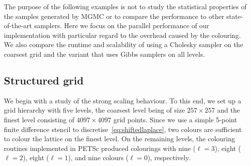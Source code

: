 \documentclass[
fontsize=11pt,
paper=a4,
numbers=noenddot
]{scrartcl}
\begin{document}

The purpose of the following examples is not to study the statistical properties of the samples generated by MGMC or to compare the performance to other state-of-the-art samplers. Here we focus on the parallel performance of our implementation with particular regard to the overhead caused by the colouring. We also compare the runtime and scalability of using a Cholesky sampler on the coarsest grid and the variant that uses Gibbs samplers on all levels.

\subsection{Structured grid}
We begin with a study of the strong scaling behaviour. To this end, we set up a grid hierarchy with five levels, the coarsest level being of size $257 \times 257$ and the finest level consisting of $4097 \times 4097$ grid points. Since we use a simple 5-point finite difference stencil to discretise~\eqref{eq:shiftedlaplace}, two colours are sufficient to colour the lattice on the finest level. On the remaining levels, the colouring routines implemented in PETSc produced colourings with nine ($\ell = 3$), eight ($\ell = 2$), eight ($\ell = 1$), and nine colours ($\ell = 0$), respectively.
\end{document}
